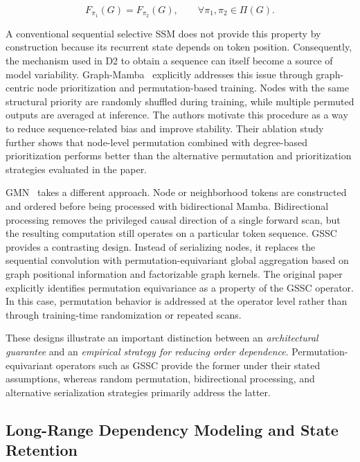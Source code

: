 \documentclass[acmsmall]{acmart}
\begin{document}
\begin{equation}
F_{\pi_1}(G)=F_{\pi_2}(G),
\qquad
\forall \pi_1,\pi_2\in\Pi(G).
\label{eq:order-independence}
\end{equation}

A conventional sequential selective SSM does not provide this property by
construction because its recurrent state depends on token position.
Consequently, the mechanism used in D2 to obtain a sequence can itself become
a source of model variability.
Graph-Mamba~\cite{wang2024graph} explicitly addresses this issue through
graph-centric node prioritization and permutation-based training. Nodes with
the same structural priority are randomly shuffled during training, while
multiple permuted outputs are averaged at inference. The authors motivate this
procedure as a way to reduce sequence-related bias and improve stability.
Their ablation study further shows that node-level permutation combined with
degree-based prioritization performs better than the alternative permutation
and prioritization strategies evaluated in the paper. 

GMN~\cite{behrouz2024graph} takes a different approach. Node or neighborhood
tokens are constructed and ordered before being processed with bidirectional
Mamba. Bidirectional processing removes the privileged causal direction of a
single forward scan, but the resulting computation still operates on a
particular token sequence.
GSSC~\cite{huang2024can} provides a contrasting design. Instead of serializing
nodes, it replaces the sequential convolution with permutation-equivariant
global aggregation based on graph positional information and factorizable
graph kernels. The original paper explicitly identifies permutation
equivariance as a property of the GSSC operator. In this case, permutation
behavior is addressed at the operator level rather than through training-time
randomization or repeated scans.

These designs illustrate an important distinction between an
\emph{architectural guarantee} and an \emph{empirical strategy for reducing
order dependence}. Permutation-equivariant operators such as GSSC provide the
former under their stated assumptions, whereas random permutation,
bidirectional processing, and alternative serialization strategies primarily
address the latter. 

\subsection{Long-Range Dependency Modeling and State Retention}
\label{subsec:long-range}
\end{document}
